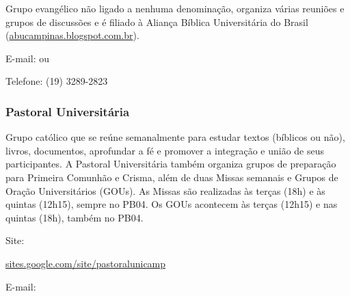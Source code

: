 Grupo evangélico não ligado a nenhuma denominação, organiza várias reuniões e
grupos de discussões e é filiado à Aliança Bíblica Universitária do Brasil
(\url{abucampinas.blogspot.com.br}).

\begin{compactitemize}
\item E-mail:  ou
\item Telefone: (19) 3289-2823
\end{compactitemize}

\subsubsection{Pastoral Universitária}

Grupo católico que se reúne semanalmente para estudar textos (bíblicos ou não),
livros, documentos, aprofundar a fé e promover a integração e união de seus
participantes. A Pastoral Universitária também organiza grupos de preparação
para Primeira Comunhão e Crisma, além de duas Missas semanais e Grupos de
Oração Universitários (GOUs). As Missas são realizadas às terças (18h) e às
quintas (12h15), sempre no PB04. Os GOUs acontecem às terças (12h15) e nas
quintas (18h), também no PB04.

\begin{compactitemize}
\item Site:
\begin{small}
  \url{sites.google.com/site/pastoralunicamp}
\end{small}
\item E-mail: 
\end{compactitemize}
